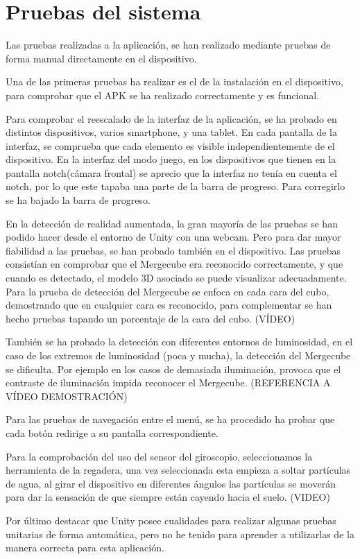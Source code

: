 \section{Pruebas del sistema}
Las pruebas realizadas a la aplicación, se han realizado mediante pruebas de forma manual directamente en el dispositivo.

Una de las primeras pruebas ha realizar es el de la instalación en el dispositivo, para comprobar que el APK se ha realizado correctamente y es funcional. 

Para comprobar el reescalado de la interfaz de la aplicación, se ha probado en distintos dispositivos, varios smartphone, y una tablet. En cada pantalla de la interfaz, se comprueba que cada elemento es visible independientemente de el dispositivo.
En la interfaz del modo juego, en los dispositivos que tienen en la pantalla notch(cámara frontal) se aprecio que la interfaz no tenía en cuenta el notch, por lo que este tapaba una parte de la barra de progreso. Para corregirlo se ha bajado la barra de progreso.

En la detección de realidad aumentada, la gran mayoría de las pruebas se han podido hacer desde el entorno de Unity con una webcam. Pero para dar mayor fiabilidad a las pruebas, se han probado también en el dispositivo. Las pruebas consistían en comprobar que el Mergecube era reconocido correctamente, y que cuando es detectado, el modelo 3D asociado se puede visualizar adecuadamente. Para la prueba de detección del Mergecube se enfoca en cada cara del cubo, demostrando que en cualquier cara es reconocido, para complementar se han hecho pruebas tapando un porcentaje de la cara del cubo. (VÍDEO)

También se ha probado la detección con diferentes entornos de luminosidad, en el caso de los extremos de luminosidad (poca y mucha), la detección del Mergecube se dificulta. Por ejemplo en los casos de demasiada iluminación, provoca que el contraste de iluminación impida reconocer el Mergecube. (REFERENCIA A VÍDEO DEMOSTRACIÓN)

Para las pruebas de navegación entre el menú, se ha procedido ha probar que cada botón redirige a su pantalla correspondiente.

Para la comprobación del uso del sensor del giroscopio, seleccionamos la herramienta de la regadera, una vez seleccionada esta empieza a soltar partículas de agua, al girar el dispositivo en diferentes ángulos las partículas se moverán para dar la sensación de que siempre están cayendo hacia el suelo. (VIDEO)







Por último destacar que Unity posee cualidades para realizar algunas pruebas unitarias de forma automática, pero no he tenido para aprender a utilizarlas de la manera correcta para esta aplicación. 